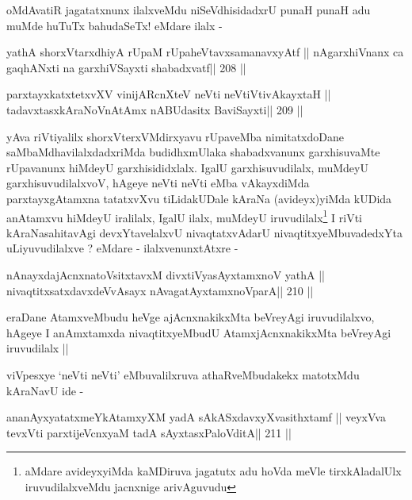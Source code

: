 \begin{artha}
oMdAvatiR jagatatxnunx ilalxveMdu niSeVdhisidadxrU punaH punaH adu
muMde huTuTx bahudaSeTx! eMdare ilalx -
\end{artha}

\begin{shl}
yathA shorxVtarxdhiyA rUpaM rUpaheVtavxsamanavxyAtf ||
nAgarxhiVnanx ca gaqhANxti na garxhiVSayxti shabadxvatf\hfill || 208 ||
\end{shl}

\begin{shl}
parxtayxkatxtetxvXV vinijARcnXteV neVti neVtiVtivAkayxtaH ||
tadavxtasxkAraNoV\s nAtAmx nABUdasitx BaviSayxti\hfill || 209 ||
\end{shl}

\begin{artha}
yAva riVtiyalilx shorxVterxVMdirxyavu rUpaveMba nimitatxdoDane
saMbaMdhavilalxdadxriMda budidhxmUlaka shabadxvanunx garxhisuvaMte
rUpavanunx hiMdeyU garxhisididxlalx. IgalU garxhisuvudilalx, muMdeyU
garxhisuvudilalxvoV, hAgeye neVti neVti eMba vAkayxdiMda
parxtayxgAtamxna tatatxvXvu tiLidakUDale kAraNa (avideyx)yiMda kUDida
anAtamxvu hiMdeyU iralilalx, IgalU ilalx, muMdeyU
iruvudilalx\footnote[1]{aMdare avideyxyiMda kaMDiruva jagatutx adu
  hoVda meVle tirxkAladalUlx iruvudilalxveMdu jacnxnige arivAguvudu}
I riVti kAraNasahitavAgi devxYtavelalxvU nivaqtatxvAdarU
nivaqtitxyeMbuvadedxYta uLiyuvudilalxve ? eMdare - ilalxvenunxtAtxre -
\end{artha}

\begin{shl}
nAnayxdajAcnxnatoV\s sitxtavxM divxtiVyasAyx\s\s tamxnoV yathA ||
nivaqtitxsatxdavxdeVvAsayx nAvagatAyxtamxnoV\s parA\hfill || 210 ||
\end{shl}

\begin{artha}
eraDane AtamxveMbudu heVge ajAcnxnakikxMta beVreyAgi iruvudilalxvo,
hAgeye I anAmxtamxda nivaqtitxyeMbudU AtamxjAcnxnakikxMta beVreyAgi
iruvudilalx ||
\end{artha}

\begin{artha}
viVpesxye `neVti neVti' eMbuvalilxruva athaRveMbudakekx matotxMdu
kAraNavU ide -
\end{artha}

\begin{shl}
ananAyxyatatxmeYkAtamxyXM yadA sAkASxdavxyXvasithxtamf ||
veyxVva tevxVti parxtijeVcnxyaM tadA sAyxtasxPaloVditA\hfill || 211 ||
\end{shl}


